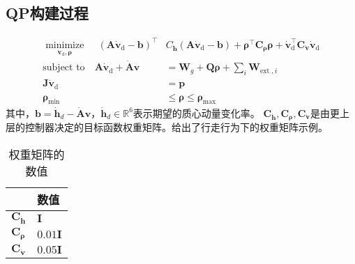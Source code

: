 \subsection{QP构建过程}
\begin{equation}
    \label{equ:qp_control}
    \begin{aligned}
       \underset{{{{\dot{\boldsymbol{v}}}}_{\text{d}}},\boldsymbol{\rho}}{\mathop{\operatorname{minimize}}}\,\quad {{\left( \boldsymbol{A}{{{\dot{\boldsymbol{v}}}}_{\text{d}}}-\boldsymbol{b} \right)}^{\top }}&{{C}_{{\dot{\boldsymbol{h}}}}}\left( \boldsymbol{A}{{{\dot{\boldsymbol{v}}}}_{\text{d}}}-\boldsymbol{b} \right)+{{\boldsymbol{\rho} }^{\top }}{{\boldsymbol{C}}_{\boldsymbol{\rho} }}\boldsymbol{\rho} +\dot{\boldsymbol{v}}_{\text{d}}^{\top }{{\boldsymbol{C}}_{{\dot{\boldsymbol{v}}}}}{{{\dot{\boldsymbol{v}}}}_{\text{d}}} \\ 
        \text{subject to}\quad \boldsymbol{A}{{{\dot{\boldsymbol{v}}}}_{\text{d}}}+\dot{\boldsymbol{A}}\boldsymbol{v}&={\boldsymbol{{}W}_{g}}+\boldsymbol{Q}\boldsymbol{\rho} +\sum\limits_{i}{{{\boldsymbol{W}}_{\text{ext },i}}} \\ 
        \boldsymbol{J}{{{\dot{\boldsymbol{v}}}}_{\text{d}}}&=\boldsymbol{p} \\ 
        {{\boldsymbol{\rho} }_{\min }}&\le \boldsymbol{\rho} \le {{\boldsymbol{\rho} }_{\max }} 
      \end{aligned}
\end{equation}
其中，$\boldsymbol{b}={{\dot{\boldsymbol{h}}}_{d}}-\dot{\boldsymbol{A}}\boldsymbol{v}$，${{\dot{\boldsymbol{h}}}_{d}}\in {{\mathbb{R}}^{6}}$表示期望的质心动量变化率。
${{\boldsymbol{C}}_{{\dot{\boldsymbol{h}}}}},{\boldsymbol{{C}}_{\boldsymbol{\rho} }},{\boldsymbol{C}_{{\dot{\boldsymbol{v}}}}}$是由更上层的控制器决定的目标函数权重矩阵。给出了行走行为下的权重矩阵示例。
\begin{table}[htbp]
	\centering
	\caption{权重矩阵的数值}
	\label{tab:qp_weight}
	\begin{tabular}{m{2cm}<{\centering}m{2cm}<{\centering}}
		\toprule  %
		\fangsong{参数名称}   &数值  \\
		\midrule  %
		${{\boldsymbol{C}}_{{\dot{\boldsymbol{h}}}}}$    & $\mathbf{I}$\\
		${\boldsymbol{{C}}_{\boldsymbol{\rho} }}$ &  $0.01 \mathbf{I}$ \\
		${\boldsymbol{C}_{{\dot{\boldsymbol{v}}}}}$ & $0.05 \mathbf{I}$ \\
		\bottomrule %
	\end{tabular}
\end{table}

